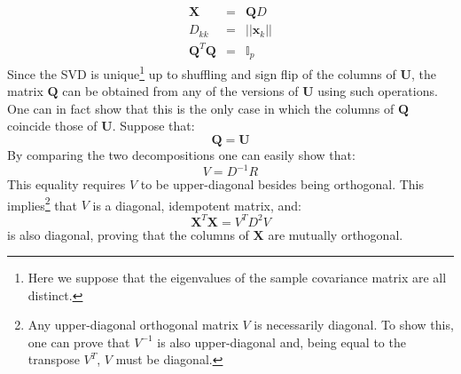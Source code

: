 \begin{eqnarray*}
    \mathbf{X} & = & \mathbf{Q} D \\
    D_{kk} & = & ||\mathbf{x}_k|| \\
    \mathbf{Q}^T \mathbf{Q} & = & \mathbb{I}_p
\end{eqnarray*}
Since the SVD is unique\footnote{Here we suppose that the eigenvalues of
the sample covariance matrix are all distinct.} up to shuffling and sign flip
of the columns of $\mathbf{U}$, the matrix $\mathbf{Q}$ can be obtained from
any of the versions of $\mathbf{U}$ using such operations. One can in fact show that 
this is the only case in which the columns of $\mathbf{Q}$
coincide those of $\mathbf{U}$. Suppose that:
\begin{equation*}
\mathbf{Q} = \mathbf{U}
\end{equation*}
By comparing the two decompositions one can easily show that:
\begin{equation*}
V = D^{-1} R
\end{equation*}
This equality requires $V$ to be upper-diagonal besides being orthogonal. This
implies\footnote{Any upper-diagonal orthogonal matrix $V$ is necessarily diagonal. To
show this, one can prove that $V^{-1}$ is also upper-diagonal and, being
equal to the transpose $V^T$, $V$ must be diagonal.} that $V$ is a diagonal, idempotent matrix, and:
\begin{equation*}
\mathbf{X}^T \mathbf{X} = V^T D ^2 V
\end{equation*}
is also diagonal, proving that the columns of $\mathbf{X}$ are mutually orthogonal.

